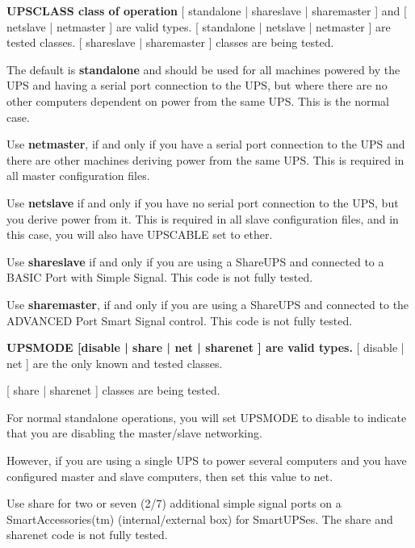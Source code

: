 \begin{description}

\item {\bf UPSCLASS \lt{}class of operation\gt{}}
[ standalone | shareslave | sharemaster ] and [ netslave | netmaster ] are
valid types. [ standalone | netslave | netmaster ] are tested classes. [
shareslave | sharemaster ] classes are being tested.  

The default is {\bf standalone} and should be used for all machines powered by
the UPS and having a serial port connection to the UPS, but where there are no
other computers dependent on power from the same UPS. This is the normal case.
 

Use {\bf netmaster}, if and only if you have a serial port connection to the
UPS and there are other machines deriving power from the same UPS. This is
required in all master configuration files.  

Use {\bf netslave} if and only if you have no serial port connection to the
UPS, but you derive power from it. This is required in all slave configuration
files, and in this case, you will also have UPSCABLE set to ether.  

Use {\bf shareslave} if and only if you are using a ShareUPS and connected to
a BASIC Port with Simple Signal. This code is not fully tested.  

Use {\bf sharemaster}, if and only if you are using a ShareUPS and connected
to the ADVANCED Port Smart Signal control. This code is not fully tested.  

\item {\bf UPSMODE [disable | share | net | sharenet ] are valid types.}
[ disable | net ] are the only known and tested classes.  

[ share | sharenet ] classes are being tested.  

For normal standalone operations, you will set UPSMODE to disable to indicate
that you are disabling the master/slave networking.  

However, if you are using a single UPS to power several computers and you have
configured master and slave computers, then set this value to net.  

Use share for two or seven (2/7) additional simple signal ports on a
SmartAccessories(tm) (internal/external box) for SmartUPSes. The share and
sharenet code is not fully tested.  


\end{description}
